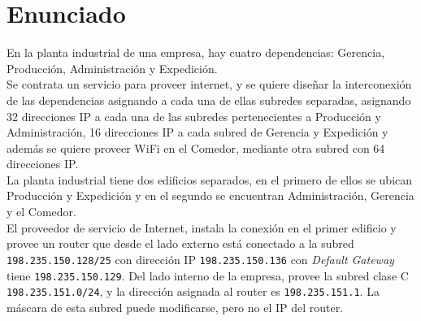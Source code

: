 \section{Enunciado}
En la planta industrial de una empresa, hay cuatro dependencias: Gerencia, Producción, Administración y Expedición.\\

Se contrata un servicio para proveer internet, y se quiere diseñar la interconexión de las dependencias asignando a cada una de ellas subredes separadas, asignando 32 direcciones IP a cada una de las subredes pertenecientes a Producción y Administración, 16 direcciones IP a cada subred de Gerencia y Expedición y además se quiere proveer WiFi en el Comedor, mediante otra subred con 64 direcciones IP.\\

La planta industrial tiene dos edificios separados, en el primero de ellos se ubican Producción y Expedición y en el segundo se encuentran Administración, Gerencia y el Comedor.\\

El proveedor de servicio de Internet, instala la conexión en el primer edificio y provee un router que desde el lado externo está conectado a la subred \texttt{198.235.150.128/25} con dirección IP \texttt{198.235.150.136} con \textit{Default Gateway} tiene \texttt{198.235.150.129}. Del lado interno de la empresa, provee la subred clase C \texttt{198.235.151.0/24}, y la dirección asignada al router es \texttt{198.235.151.1}. La máscara de esta subred puede modificarse, pero no el IP del router.\\


